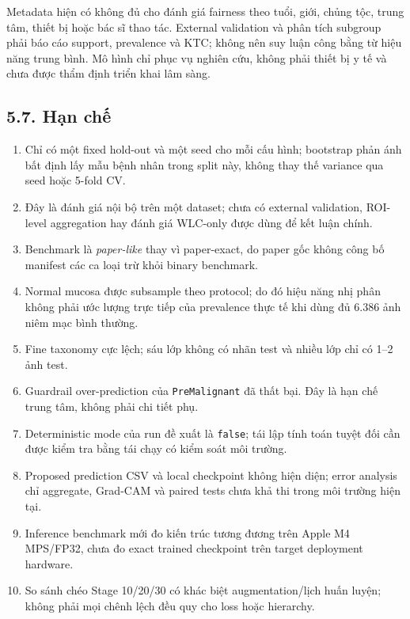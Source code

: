 \documentclass[
  10pt,
  a4paper,
  twocolumn]{article}
\providecommand{\tightlist}{%
  \setlength{\itemsep}{0pt}\setlength{\parskip}{0pt}}
\begin{document}
Metadata hiện có không đủ cho đánh giá fairness theo tuổi, giới, chủng
tộc, trung tâm, thiết bị hoặc bác sĩ thao tác. External validation và
phân tích subgroup phải báo cáo support, prevalence và KTC; không nên
suy luận công bằng từ hiệu năng trung bình. Mô hình chỉ phục vụ nghiên
cứu, không phải thiết bị y tế và chưa được thẩm định triển khai lâm
sàng.

\subsection{5.7. Hạn chế}\label{hux1ea1n-chux1ebf}

\begin{enumerate}
\def\labelenumi{\arabic{enumi}.}
\tightlist
\item
  Chỉ có một fixed hold-out và một seed cho mỗi cấu hình; bootstrap phản
  ánh bất định lấy mẫu bệnh nhân trong split này, không thay thế
  variance qua seed hoặc 5-fold CV.
\item
  Đây là đánh giá nội bộ trên một dataset; chưa có external validation,
  ROI-level aggregation hay đánh giá WLC-only được dùng để kết luận
  chính.
\item
  Benchmark là \emph{paper-like} thay vì paper-exact, do paper gốc không
  công bố manifest các ca loại trừ khỏi binary benchmark.
\item
  Normal mucosa được subsample theo protocol; do đó hiệu năng nhị phân
  không phải ước lượng trực tiếp của prevalence thực tế khi dùng đủ
  6.386 ảnh niêm mạc bình thường.
\item
  Fine taxonomy cực lệch; sáu lớp không có nhãn test và nhiều lớp chỉ có
  1--2 ảnh test.
\item
  Guardrail over-prediction của \texttt{PreMalignant} đã thất bại. Đây
  là hạn chế trung tâm, không phải chi tiết phụ.
\item
  Deterministic mode của run đề xuất là \texttt{false}; tái lập tính
  toán tuyệt đối cần được kiểm tra bằng tái chạy có kiểm soát môi
  trường.
\item
  Proposed prediction CSV và local checkpoint không hiện diện; error
  analysis chỉ aggregate, Grad-CAM và paired tests chưa khả thi trong
  môi trường hiện tại.
\item
  Inference benchmark mới đo kiến trúc tương đương trên Apple M4
  MPS/FP32, chưa đo exact trained checkpoint trên target deployment
  hardware.
\item
  So sánh chéo Stage 10/20/30 có khác biệt augmentation/lịch huấn luyện;
  không phải mọi chênh lệch đều quy cho loss hoặc hierarchy.
\end{enumerate}
\end{document}
